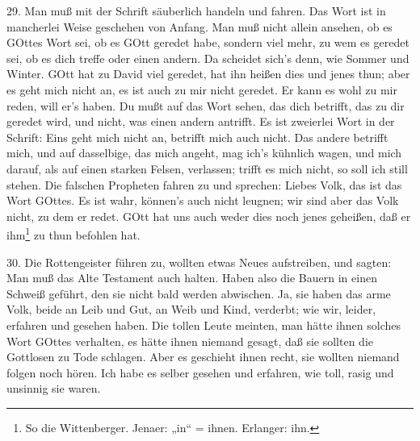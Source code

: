 29. Man muß mit der Schrift säuberlich handeln und fahren. Das Wort ist in mancherlei Weise geschehen von Anfang. Man muß nicht allein ansehen, ob es GOttes Wort sei, ob es GOtt geredet habe, sondern viel mehr, zu wem es geredet sei, ob es dich treffe oder einen andern. Da scheidet sich’s denn, wie Sommer und Winter. GOtt hat zu David viel geredet, hat ihn heißen dies und jenes thun; aber es geht mich nicht an, es ist auch zu mir nicht geredet. Er kann es wohl zu mir reden, will er’s haben. Du mußt auf das Wort sehen, das dich betrifft, das zu dir geredet wird, und nicht, was einen andern antrifft. Es ist zweierlei Wort in der Schrift: Eins geht mich nicht an, betrifft mich auch nicht. Das andere betrifft mich, und auf dasselbige, das mich angeht, mag ich’s kühnlich wagen, und mich darauf, als auf einen starken Felsen, verlassen; trifft es mich nicht, so soll ich still stehen. Die falschen Propheten fahren zu und sprechen: Liebes Volk, das ist das Wort GOttes. Es ist wahr, können’s auch nicht leugnen; wir sind aber das Volk nicht, zu dem er redet. GOtt hat uns auch weder dies noch jenes geheißen, daß er ihm\footnote{So die Wittenberger. Jenaer: „in“ = ihnen. Erlanger: ihn.} zu thun befohlen hat.

30. Die Rottengeister führen zu, wollten etwas Neues aufstreiben, und sagten: Man muß das Alte Testament auch halten. Haben also die Bauern in einen Schweiß geführt, den sie nicht bald werden abwischen. Ja, sie haben das arme Volk, beide an Leib und Gut, an Weib und Kind, verderbt; wie wir, leider, erfahren und gesehen haben. Die tollen Leute meinten, man hätte ihnen solches Wort GOttes verhalten, es hätte ihnen niemand gesagt, daß sie sollten die Gottlosen zu Tode schlagen. Aber es geschieht ihnen recht, sie wollten niemand folgen noch hören. Ich habe es selber gesehen und erfahren, wie toll, rasig und unsinnig sie waren.


